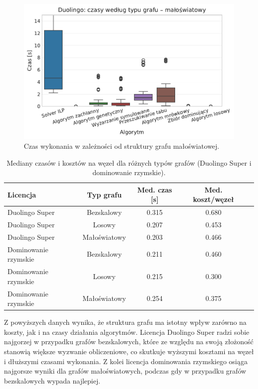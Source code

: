 \begin{figure}[H]
  \centering
  \includegraphics[width=0.65\linewidth]{assets/figures/benchmark/synthetic/duolingo_time_by_graph_small_world.pdf}
  \caption{Czas wykonania w zależności od struktury grafu małoświatowej.}
  \label{fig:duo-synth-time-small-world}
\end{figure}


\begin{table}[H]
  \centering
  \caption{Mediany czasów i kosztów na węzeł dla różnych typów grafów (Duolingo Super i dominowanie rzymskie).}
  \label{tab:duo-synth-summary-times}
  \begin{tabular}{lcccc}
    \toprule
    \textbf{Licencja}    & \textbf{Typ grafu} & \textbf{Med. czas [s]} & \textbf{Med. koszt/węzeł} \\
    \midrule
    Duolingo Super       & Bezskalowy         & 0.315                  & 0.680                     \\
    Duolingo Super       & Losowy             & 0.207                  & 0.453                     \\
    Duolingo Super       & Małoświatowy       & 0.203                  & 0.466                     \\
    Dominowanie rzymskie & Bezskalowy         & 0.211                  & 0.460                     \\
    Dominowanie rzymskie & Losowy             & 0.215                  & 0.300                     \\
    Dominowanie rzymskie & Małoświatowy       & 0.254                  & 0.375                     \\
    \bottomrule
  \end{tabular}
\end{table}

Z powyższych danych wynika, że struktura grafu ma istotny wpływ zarówno na koszty, jak i na czasy działania algorytmów. Licencja Duolingo Super radzi sobie najgorzej w przypadku grafów bezskalowych, które ze względu na swoją złożoność stanowią większe wyzwanie obliczeniowe, co skutkuje wyższymi kosztami na węzeł i dłuższymi czasami wykonania. Z kolei licencja dominowania rzymskiego osiąga najgorsze wyniki dla grafów małoświatowych, podczas gdy w przypadku grafów bezskalowych wypada najlepiej.

